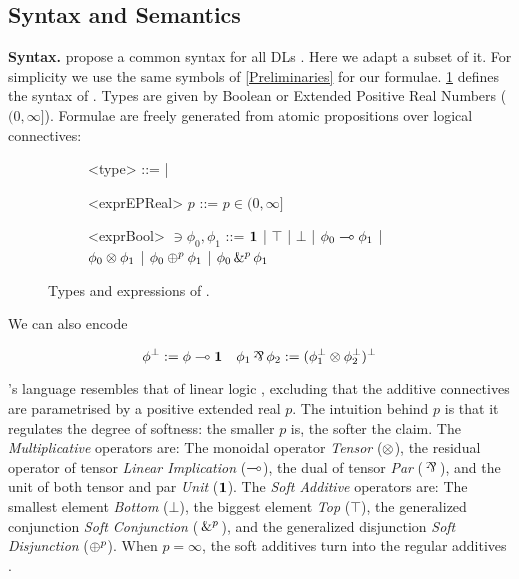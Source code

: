 \subsection{Syntax and Semantics}

\textbf{Syntax.}  \citeauthor{slusarz2023logic} propose a common syntax for all DLs \citep{slusarz2023logic}. Here we adapt a subset of it.  For simplicity we use the same symbols of \cref{Preliminaries} for our formulae. \cref{fig:syntax} defines the syntax of \OL{}. Types are given by Boolean or  Extended Positive Real Numbers ($(0,\infty]$). Formulae are freely generated from atomic propositions over logical connectives:\\

\begin{figure}[H]
\begin{subfigure}[t]{0.4\textwidth}
	\begin{grammar}
		<type> ::=  
        \BoolType | \ERealType 

        
	\end{grammar}
\end{subfigure}
\hfill
\begin{subfigure}[t]{1\textwidth}
	\begin{grammar}
		<exprEPReal> $p$ ::=  
        $p \in (0, \infty]$ 
	\end{grammar}
\end{subfigure}
\begin{subfigure}[t]{1\textwidth}
	\begin{grammar}
		<exprBool> $\ni \phi_{0},\phi_{1}$ ::=  
        $\textbf{1}$ | $\top$ | $\bot$ | $\phi_{0} \multimap{} \phi_{1}$ | $\phi_{0} \otimes{} \phi_{1}$ | $\phi_{0} \oplus^{p} \phi_{1}$ | $\phi_{0} \,\&^{p}\, \phi_{1}$ 
	\end{grammar}
\end{subfigure}
\hfill
\setlength{\belowcaptionskip}{-20pt} 
	\caption{Types and expressions of \OL{}.\\
	}
	\label{fig:syntax}
\end{figure}
We can also encode 

$$\ldual{\phi} := \phi \ediv{} \unit \quad \phi_1 \dismul{} \phi_2 := \ldual{(\ldual{\phi_1} \conmul{} \ldual{\phi_2})}$$

\OL{}'s language resembles that of linear logic \citep{Wadler1993, agliano2025algebraic}, excluding that the additive connectives are parametrised by a positive extended real $p$. The intuition behind $p$ is that it regulates the degree of softness: the smaller $p$ is, the softer the claim.
The \emph{Multiplicative} operators are: The monoidal operator \emph{Tensor} ($\otimes{}$), the residual operator of tensor \emph{Linear Implication} ($\multimap$), the dual of tensor \emph{Par} ($\dismul{}$), and the unit of both tensor and par \emph{Unit} ($\textbf{1}$). The \emph{Soft Additive} operators are: The smallest element \emph{Bottom} ($\bot$), the biggest element \emph{Top} ($\top$), the generalized conjunction \emph{Soft Conjunction} ($\,\&^{p}\,$), and the generalized disjunction \emph{Soft Disjunction} ($\oplus^{p}$). When $p = \infty$, the soft additives turn into the regular additives \citep{galatos2007residuated}.

